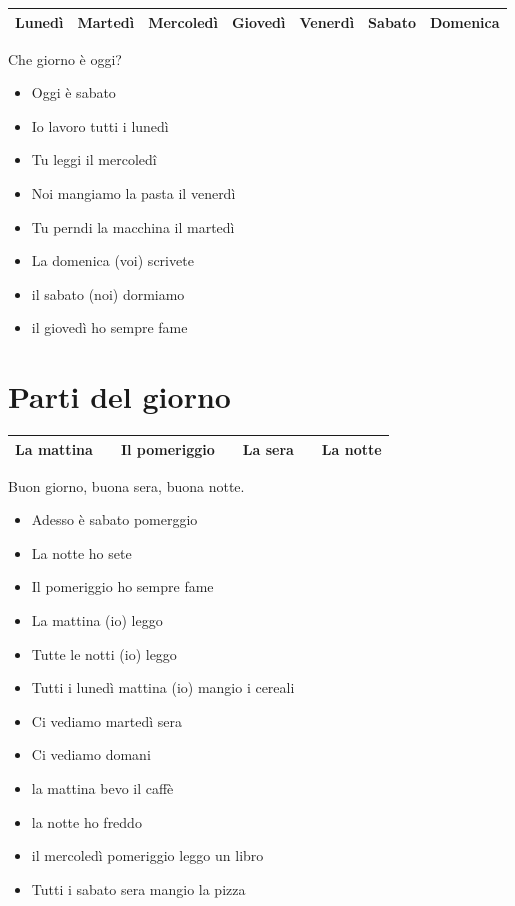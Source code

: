 \documentclass[letter,11pt]{article}
\begin{document}
\begin{tabular}{ |p{2cm}| p{2cm}| p{2cm}| p{2cm}| p{2cm}| p{2cm}| p{2cm}| }

    \hline
    \hline
    Lunedì & Martedì & Mercoledì & Giovedì & Venerdì & Sabato & Domenica\\ \hline
    \hline
\end{tabular}

\vskip 0.2in

Che giorno è oggi?
\begin{multicols}{2}
\begin{itemize}
    \item Oggi è sabato
    \item Io lavoro tutti i lunedì
    \item Tu leggi il mercoledî
    \item Noi mangiamo la pasta il venerdì
    \item Tu perndi la macchina il martedì
    \item La domenica (voi) scrivete
    \item il sabato (noi) dormiamo
    \item il giovedì ho sempre fame
\end{itemize}
\end{multicols}

\vskip 0.2in

\section*{Parti del giorno}
\vskip 0.2in

\begin{tabular}{ |p{2.5cm}| p{0.5cm}| p{2.5cm}| p{0.5cm}| p{2.5cm}| p{0.5cm}| p{2.5cm}| }

    \hline
    La mattina &  & Il pomeriggio &  & La sera &  & La notte\\ \hline
    \hline
\end{tabular}
\vskip 0.2in
Buon giorno, buona sera, buona notte.
\begin{multicols}{2}
\begin{itemize}
    \item Adesso è sabato pomerggio
    \item La notte ho sete
    \item Il pomeriggio ho sempre fame
    \item La mattina (io) leggo
    \item Tutte le notti (io) leggo
    \item Tutti i lunedì mattina (io) mangio i cereali

    \item Ci vediamo martedì sera
    \item Ci vediamo domani
    \item la mattina bevo il caffè
    \item la notte ho freddo
    \item il mercoledì pomeriggio leggo un libro
    \item Tutti i sabato sera mangio la pizza
\end{itemize}
\end{multicols}
\end{document}

